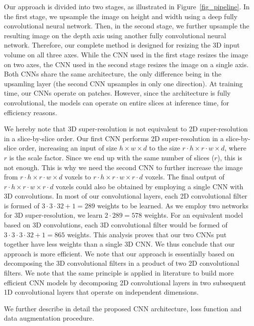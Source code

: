 \documentclass{ieeeaccess}
\begin{document}
Our approach is divided into two stages, as illustrated in Figure~\ref{fig_pipeline}. In the first stage, we upsample the image on height and width using a deep fully convolutional neural network. Then, in the second stage, we further upsample the resulting image on the depth axis using another fully convolutional neural network. Therefore, our complete method is designed for resizing the 3D input volume on all three axes. While the CNN used in the first stage resizes the image on two axes, the CNN used in the second stage resizes the image on a single axis. Both CNNs share the same architecture, the only difference being in the upsamling layer (the second CNN upsamples in only one direction). At training time, our CNNs operate on patches. However, since the architecture is fully convolutional, the models can operate on entire slices at inference time, for efficiency reasons.

We hereby note that 3D super-resolution is not equivalent to 2D super-resolution in a slice-by-slice order. Our first CNN performs 2D super-resolution in a slice-by-slice order, increasing an input of size $h \times w \times d$ to the size $r \cdot h \times r \cdot w \times d$, where $r$ is the scale factor. Since we end up with the same number of slices ($r$), this is not enough. This is why we need the second CNN to further increase the image from $r \cdot h \times r \cdot w \times d$ voxels to $r \cdot h \times r \cdot w \times r \cdot d$ voxels. The final output of $r \cdot h \times r \cdot w \times r \cdot d$ voxels could also be obtained by employing a single CNN with 3D convolutions. In most of our convolutional layers, each 2D convolutional filter is formed of $3 \cdot 3 \cdot 32+1=289$ weights to be learned. As we employ two networks for 3D super-resolution, we learn $2 \cdot 289 = 578$ weights. For an equivalent model based on 3D convolutions, each 3D convolutional filter would be formed of $3 \cdot 3 \cdot 3 \cdot 32+1=865$ weights. This analysis proves that our two CNNs put together have less weights than a single 3D CNN. We thus conclude that our approach is more efficient. We note that our approach is essentially based on decomposing the 3D convolutional filters in a product of two 2D convolutional filters. We note that the same principle is applied in literature \cite{Howard-arXiv-2017,Jaderberg-BMVC-2014} to build more efficient CNN models by decomposing 2D convolutional layers in two subsequent 1D convolutional layers that operate on independent dimensions.
 
We further describe in detail the proposed CNN architecture, loss function and data augmentation procedure.
\end{document}
